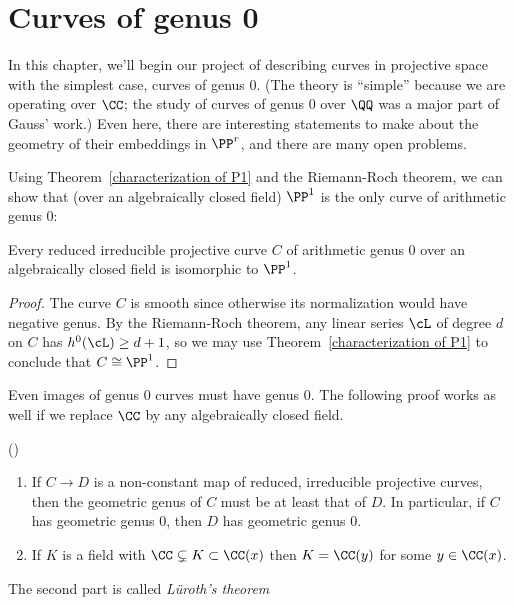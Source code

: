 

\chapter{Curves of genus 0 }\label{genus 0 chapter}

In this chapter, we'll begin our project of describing curves in projective space with the simplest case, curves of genus 0. (The theory is ``simple'' because we are operating over $\CC$; the study of curves of genus 0 over $\QQ$ was a major part of Gauss' work.) Even here, there are interesting statements to make about the geometry of their embeddings in $\PP^r$, and there are many open problems.
 

Using Theorem~\ref{characterization of P1} and the Riemann-Roch theorem, we can show that (over an algebraically closed field) $\PP^1$
is the only curve of arithmetic genus 0:

\begin{corollary}
 Every reduced irreducible projective curve $C$ of arithmetic genus 0 over an algebraically closed field is isomorphic to $\PP^1$.
 \end{corollary}

\begin{proof}
The curve $C$ is smooth since otherwise its normalization would have negative genus.
By the Riemann-Roch theorem, any linear series $\cL$ of degree $d$ on $C$ has $h^0(\cL) \geq d+1$, so we may use Theorem~\ref{characterization of P1}
to conclude that $C\cong \PP^1$.
\end{proof}

Even images of genus 0 curves must have genus 0. The following proof works as well if we replace $\CC$ by any algebraically
closed field.

\begin{theorem}(\cite{Luroth})\label{Lueroth}
\begin{enumerate}
\item If $C\to D$ is a non-constant map of reduced, irreducible projective curves, then the geometric genus of $C$ must be at least that of $D$.
In particular, if $C$ has geometric genus 0,  
then $D$ has geometric genus 0.
 \item If $K$ is a field with $\CC \subsetneq K \subset \CC(x)$
  then $K = \CC(y)$ for some $y \in \CC(x)$. 
\end{enumerate}
\end{theorem}


The second part is called \emph{L\"uroth's theorem}
 
